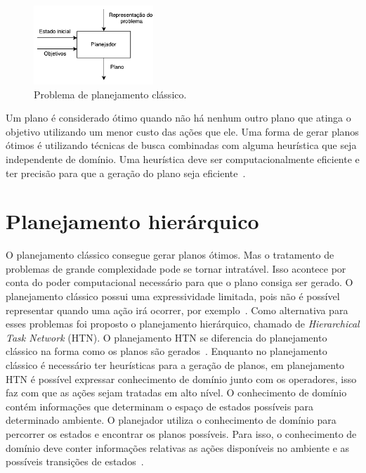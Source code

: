 \begin{figure}[ht]
	\centering
	\includegraphics[width=0.4\textwidth]{fig/modelo.pdf}
	\caption{Problema de planejamento clássico.}
	\label{fig:planmodelo}
\end{figure} 

Um plano é considerado ótimo quando não há nenhum outro plano que atinga o objetivo utilizando um menor custo das ações que ele.
Uma forma de gerar planos ótimos é utilizando técnicas de busca combinadas com alguma heurística que seja independente de domínio.
Uma heurística deve ser computacionalmente eficiente e ter precisão para que a geração do plano seja eficiente~\cite{helmert2007flexible}.

\section{Planejamento hierárquico} 
\label{sec:htnPlanning}

O planejamento clássico consegue gerar planos ótimos.
Mas o tratamento de problemas de grande complexidade pode se tornar intratável.
Isso acontece por conta do poder computacional necessário para que o plano consiga ser gerado.
O planejamento clássico possui uma expressividade limitada, pois não é possível representar quando uma ação irá ocorrer, por exemplo~\cite[Capítulo 11]{intelligence2003modern}.
Como alternativa para esses problemas foi proposto o planejamento hierárquico, chamado de \textit{Hierarchical Task Network} (HTN). 
O planejamento HTN se diferencia do planejamento clássico na forma como os planos são gerados~\cite{ghallab2004automated}. 
Enquanto no planejamento clássico é necessário ter heurísticas para a geração de planos, em planejamento HTN é possível expressar conhecimento de domínio junto com os operadores, isso faz com que as ações sejam tratadas em alto nível.  
O conhecimento de domínio contém informações que determinam o espaço de estados possíveis para determinado ambiente. 
O planejador utiliza o conhecimento de domínio para percorrer os estados e encontrar os planos possíveis. 
Para isso, o conhecimento de domínio deve conter informações relativas as ações disponíveis no ambiente e as possíveis transições de estados~\cite[Capítulo 11]{intelligence2003modern}.


